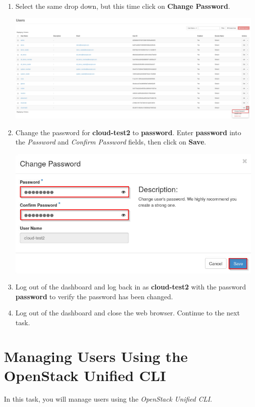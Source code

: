 \documentclass[letterpaper, 12pt]{article}
\begin{document}
\begin{enumerate}
    \item Select the same drop down, but this time click on \textbf{Change Password}.

    \begin{center}
        \includegraphics[width=\linewidth]{images/part3/step11.png}
    \end{center}
    
    \item Change the password for \textbf{cloud-test2} to \textbf{password}. Enter \textbf{password} into the
    \textit{Password} and \textit{Confirm Password} fields, then click on \textbf{Save}.

    \begin{center}
        \includegraphics[width=\linewidth]{images/part3/step12.png}
    \end{center}

    \item Log out of the dashboard and log back in as \textbf{cloud-test2} with the password \textbf{password} to verify
    the password has been changed.

    \item Log out of the dashboard and close the web browser. Continue to the next task.
\end{enumerate}

\section{Managing Users Using the OpenStack Unified CLI}
\label{sec:managing_users_using_the_openstack_unified_cli}
In this task, you will manage users using the \textit{OpenStack Unified CLI}.
\end{document}
